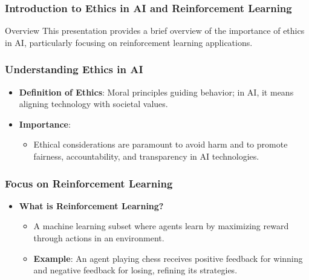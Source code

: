 \documentclass[aspectratio=169]{beamer}
\begin{document}
\frame{\titlepage}

\begin{frame}[fragile]
    \frametitle{Introduction to Ethics in AI and Reinforcement Learning}
    \begin{block}{Overview}
        This presentation provides a brief overview of the importance of ethics in AI, particularly focusing on reinforcement learning applications.
    \end{block}
\end{frame}

\begin{frame}[fragile]
    \frametitle{Understanding Ethics in AI}
    \begin{itemize}
        \item \textbf{Definition of Ethics}: Moral principles guiding behavior; in AI, it means aligning technology with societal values.
        
        \item \textbf{Importance}:
        \begin{itemize}
            \item Ethical considerations are paramount to avoid harm and to promote fairness, accountability, and transparency in AI technologies.
        \end{itemize}
    \end{itemize}
\end{frame}

\begin{frame}[fragile]
    \frametitle{Focus on Reinforcement Learning}
    \begin{itemize}
        \item \textbf{What is Reinforcement Learning?}
        \begin{itemize}
            \item A machine learning subset where agents learn by maximizing reward through actions in an environment.
            \item \textbf{Example}: An agent playing chess receives positive feedback for winning and negative feedback for losing, refining its strategies.
        \end{itemize}
    \end{itemize}
\end{frame}
\end{document}
